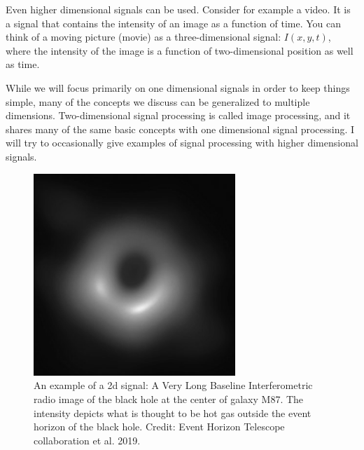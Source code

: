 Even higher dimensional signals can be used. Consider for example a video. 
It is a signal that contains the intensity of an image as a function of time. 
You can think of a moving picture (movie) as a three-dimensional signal: $I(x,y,t)$, 
where the intensity of the image is a function of two-dimensional position as well as time.

While we will focus primarily on one dimensional signals in order to keep things simple, 
many of the concepts we discuss can be generalized to multiple dimensions.
Two-dimensional signal processing is called image processing, and it shares 
many of the same basic concepts with one dimensional signal processing.
I will try to occasionally give examples of signal processing with higher dimensional signals.


\begin{figure}
   \begin{center}
      \includegraphics[width=0.68\textwidth]{code/004_dft_2d/bhi.png}
   \end{center}
   \caption{An example of a 2d signal: A Very Long Baseline Interferometric radio image of
      the black hole at the center of galaxy M87. The intensity depicts what is thought to be hot 
      gas outside the event horizon of the black hole. Credit: Event Horizon Telescope collaboration et al. 2019.}
   \label{fig:bh_example}
\end{figure}

